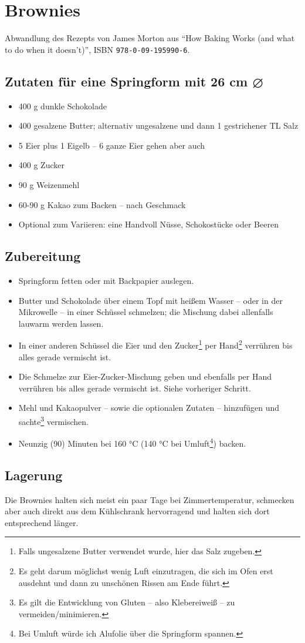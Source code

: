 \documentclass[version=last,paper=A4,DIV=15]{scrartcl}
\begin{document}
\thispagestyle{empty}

\section*{Brownies}

Abwandlung des Rezepts von James Morton aus \enquote{How Baking Works (and what to do when it doesn't)}, ISBN \texttt{978-0-09-195990-6}.

\subsection*{Zutaten für eine Springform mit 26 cm ⌀}

\begin{itemize}
    \item 400 g dunkle Schokolade
    \item 400 gesalzene Butter; alternativ ungesalzene und dann 1 gestrichener TL Salz
    \item 5 Eier plus 1 Eigelb -- 6 ganze Eier gehen aber auch
    \item 400 g Zucker
    \item 90 g Weizenmehl
    \item 60-90 g Kakao zum Backen -- nach Geschmack
    \item Optional zum Variieren: eine Handvoll Nüsse, Schokostücke oder Beeren
\end{itemize}

\subsection*{Zubereitung}

\begin{itemize}
    \item Springform fetten oder mit Backpapier auslegen.
    \item Butter und Schokolade über einem Topf mit heißem Wasser -- oder in der Mikrowelle -- in einer Schüssel schmelzen; die Mischung dabei allenfalls lauwarm werden lassen.
    \item In einer anderen Schüssel die Eier und den Zucker\footnote{Falls ungesalzene Butter verwendet wurde, hier das Salz zugeben.} per Hand\footnote{Es geht darum möglichst wenig Luft einzutragen, die sich im Ofen erst ausdehnt und dann zu unschönen Rissen am Ende führt.} verrühren bis alles gerade vermischt ist.
    \item Die Schmelze zur Eier-Zucker-Mischung geben und ebenfalls per Hand verrühren bis alles gerade vermischt ist. Siehe vorheriger Schritt.
    \item Mehl und Kakaopulver -- sowie die optionalen Zutaten -- hinzufügen und sachte\footnote{Es gilt die Entwicklung von Gluten -- also Klebereiweiß -- zu vermeiden/minimieren.} vermischen.
    \item Neunzig (90) Minuten bei 160 °C (140 °C bei Umluft\footnote{Bei Umluft würde ich Alufolie über die Springform spannen.}) backen.
\end{itemize}

\subsection*{Lagerung}

Die Brownies halten sich meist ein paar Tage bei Zimmertemperatur, schmecken aber auch direkt aus dem Kühlschrank hervorragend und halten sich dort entsprechend länger.
\end{document}
